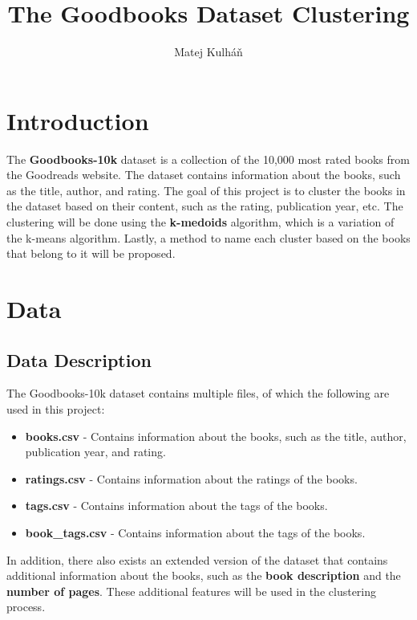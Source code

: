 \documentclass[english]{mvi-report}
\title{The Goodbooks Dataset Clustering}
\author{Matej Kulháň}
\affiliation{ČVUT - FIT}
\begin{document}
\maketitle

\section{Introduction}
The \textbf{Goodbooks-10k} dataset \cite{zygmuntz_goodbooks10k} is a collection of the 10,000 most rated books from the Goodreads website. The dataset contains information about the books, such as the title, author, and rating. The goal of this project is to cluster the books in the dataset based on their content, such as the rating, publication year, etc. The clustering will be done using the \textbf{k-medoids} algorithm, which is a variation of the k-means algorithm. Lastly, a method to name each cluster based on the books that belong to it will be proposed.


\section{Data}
\subsection{Data Description}
The Goodbooks-10k dataset contains multiple files, of which the following are used in this project:
\begin{itemize}
    \item \textbf{books.csv} - Contains information about the books, such as the title, author, publication year, and rating.
    \item \textbf{ratings.csv} - Contains information about the ratings of the books.
    \item \textbf{tags.csv} - Contains information about the tags of the books.
    \item \textbf{book\_tags.csv} - Contains information about the tags of the books.
\end{itemize}

In addition, there also exists an extended version of the dataset \cite{malcolmosh_goodbooks10k_extended} that contains additional information about the books, such as the \textbf{book description} and the \textbf{number of pages}. These additional features will be used in the clustering process.
\end{document}
